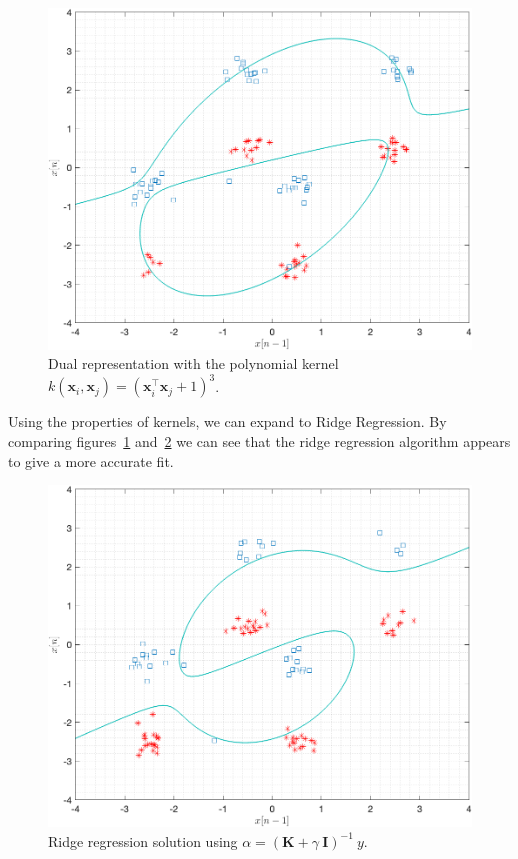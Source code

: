 \documentclass[11pt]{article}
\begin{document}
\begin{figure}[h!]
    \centering
    \includegraphics[width=\textwidth]{figure01.png}
    \caption{Dual representation with the polynomial kernel \( k (\mathbf{x}_i, \mathbf{x}_j) = (\mathbf{x}_i^\top \mathbf{x}_j + 1)^3\).}
    \label{fig:figure01}
\end{figure}

\clearpage
\begin{tcolorbox}[colback=CrispBlue!5!white,colframe=CrispBlue!75!black,title=Ridge Regression solution.]

    Using the properties of kernels, we can expand to Ridge Regression. By comparing figures~\ref{fig:figure01} and~\ref{fig:figure02} we can see that the ridge regression algorithm appears to give a more accurate fit.
    
\end{tcolorbox}
\vspace{1em}
\begin{figure}[h!]
    \centering
    \includegraphics[width=\textwidth]{figure02.png}
    \caption{Ridge regression solution using \(\alpha = (\mathbf{K} + \gamma\ \mathbf{I})^{-1}\ y\).}
    \label{fig:figure02}
\end{figure}
\end{document}
